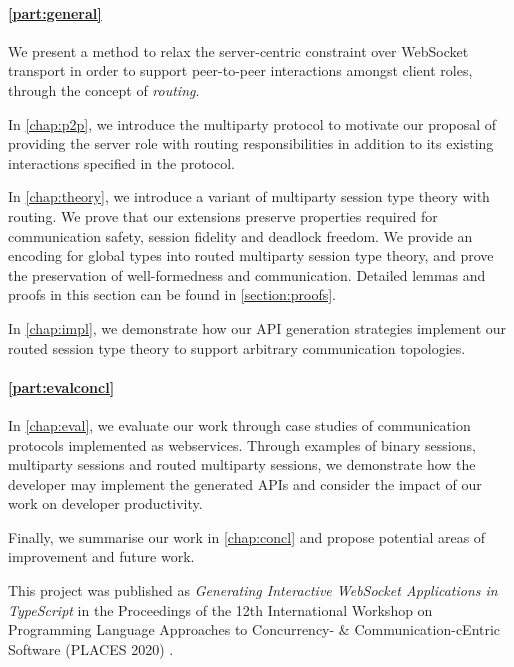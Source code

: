 \paragraph{\cref{part:general}} 
We present a method to relax the server-centric constraint over WebSocket
transport in order to support peer-to-peer interactions amongst 
client roles, through the concept of \emph{routing}.

In \cref{chap:p2p}, we introduce the  multiparty
protocol to motivate our proposal of providing the server role with 
routing responsibilities in addition to its existing interactions
specified in the protocol.

In \cref{chap:theory}, we introduce a variant of multiparty 
session type theory with routing. We prove that our extensions preserve 
properties required for communication safety, 
session fidelity and deadlock freedom.
We provide an encoding for global types into routed multiparty 
session type theory, and prove the preservation of well-formedness
and communication. Detailed lemmas and proofs in this section can
be found in \cref{section:proofs}.

In \cref{chap:impl}, we demonstrate how our API generation strategies
implement our routed session type theory to support arbitrary communication
topologies.

\paragraph{\cref{part:evalconcl}}
In \cref{chap:eval}, we evaluate our work through 
case studies of communication protocols 
implemented as webservices. Through examples of binary sessions,
multiparty sessions and routed multiparty sessions, we demonstrate how the
developer may implement the generated APIs and consider the impact of our work
on developer productivity.

Finally, we summarise our work in \cref{chap:concl} and propose potential
areas of improvement and future work.

\begin{remark}
This project was published as \emph{Generating Interactive WebSocket 
Applications in TypeScript} in the Proceedings of the 
12th International Workshop on Programming Language Approaches to 
Concurrency- \& Communication-cEntric Software (PLACES 2020) 
\cite{PLACES2020}.
\end{remark}
